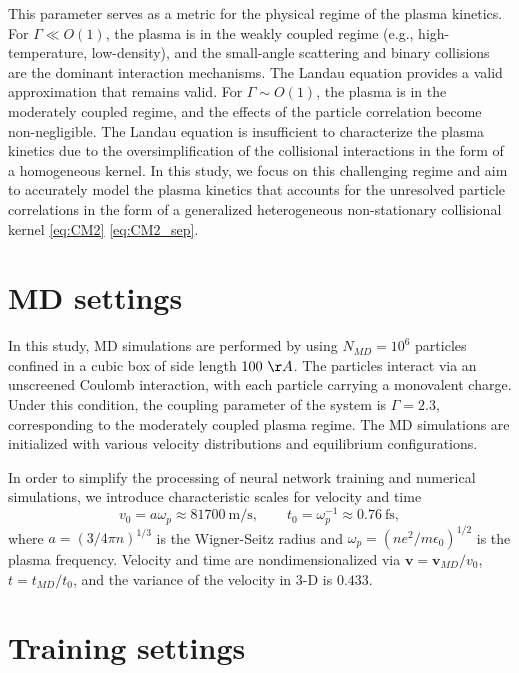 \documentclass[preprint,1p,times]{elsarticle}
\theoremstyle{definition}
\theoremstyle{remark}
\begin{document}
This parameter serves as a metric for the physical regime of the plasma kinetics. For $\Gamma \ll O(1)$, the plasma is in the weakly coupled regime (e.g., high-temperature, low-density), and the small-angle scattering and binary collisions are the dominant interaction mechanisms. The Landau equation provides a valid approximation that remains valid.
For $\Gamma \sim O(1)$, the plasma is in the moderately coupled regime, and the effects of the particle correlation become non-negligible. The Landau equation is insufficient to characterize the plasma kinetics due to the oversimplification of the collisional interactions in the form of a homogeneous kernel. In this study, we focus on this challenging regime and aim to accurately model the plasma kinetics that accounts for the unresolved particle correlations in the form of a generalized heterogeneous non-stationary collisional kernel \eqref{eq:CM2} \eqref{eq:CM2_sep}. 

\section{MD settings}
\label{sec:MD}
In this study, MD simulations are performed by using $N_{MD} = 10^{6}$ particles confined in a cubic box of side length $100~\AA$.
The particles interact via an unscreened Coulomb interaction, with each particle carrying a monovalent charge.
Under this condition, the coupling parameter of the system is $\Gamma=2.3$, corresponding to the moderately coupled plasma regime.
The MD simulations are initialized with various velocity distributions and equilibrium configurations.

In order to simplify the processing of neural network training and numerical simulations, we introduce characteristic scales for velocity and time
\begin{equation}
    v_{0} = a \omega_p \approx 81700 ~ \text{m/s}, \qquad t_{0} = \omega_{p}^{-1}\approx 0.76 ~ \text{fs} ,
\end{equation}
where $a = \left(3/4\pi n\right)^{1/3}$ is the Wigner-Seitz radius and $\omega_p = (n e^2/m \epsilon_0 )^{1/2}$ is the plasma frequency.
Velocity and time are nondimensionalized via $\boldsymbol{v} = \boldsymbol{v}_{MD}/v_{0}$, $t=t_{MD}/t_{0}$, and the variance of the velocity in $3$-D is $0.433$.


\section{Training settings}
\label{sec:training}
\end{document}
